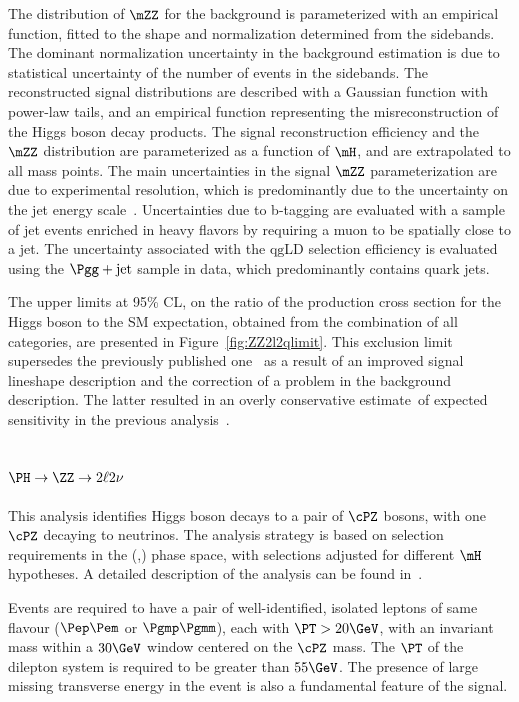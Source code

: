The distribution of $\mZZ$ for the background is parameterized with an empirical function, fitted to the shape and normalization determined from the sidebands. The dominant normalization uncertainty in the background estimation
is due to statistical uncertainty of the number of events in the sidebands. The reconstructed signal distributions are 
described with a Gaussian function with power-law tails, and an empirical function representing the misreconstruction of
the Higgs boson decay products. The signal reconstruction efficiency and the $\mZZ$ distribution are parameterized as a 
function of $\mH$, and are extrapolated to all mass points. The main uncertainties in the signal $\mZZ$ parameterization
are due to experimental resolution, which is predominantly due to the uncertainty on the jet energy scale~\cite{Chatrchyan:2011ds}. Uncertainties due to b-tagging are evaluated with a sample of jet events enriched in
heavy flavors by requiring a muon to be spatially close to a jet. The uncertainty associated with the $\mathrm{qg}$LD 
selection efficiency is evaluated using the $\Pgg+\text{jet}$ sample in data, which predominantly contains quark jets.

The upper limits at 95\% CL, on the ratio of the production cross section for the Higgs boson to the SM expectation,
obtained from the combination of all categories, are presented in Figure~\ref{fig:ZZ2l2qlimit}.
This exclusion limit supersedes the previously published one~\cite{2l2qpaper} as a result of
an improved signal lineshape description and the correction of
a problem
in the background
description. The latter resulted in an overly conservative estimate of expected sensitivity in
the previous analysis~\cite{2l2qpaper}.

\subsection{$\PH \to \ZZ \to 2\ell 2\nu$}

This analysis identifies Higgs boson decays to a pair of $\cPZ$ bosons, with one $\cPZ$ decaying to neutrinos. The
analysis strategy is based on selection requirements in the (\MET,\MT) phase space, with selections adjusted for
different $\mH$ hypotheses. A detailed description of the analysis can be found in~\cite{Chatrchyan:2012ft}.

Events are required to have a pair of well-identified, isolated leptons of same flavour ($\Pep\Pem$ or $\Pgmp\Pgmm$),
each with $\PT > 20\GeV$, with an invariant mass within a $30\GeV$ window centered on the $\cPZ$ mass. The $\PT$
of the dilepton system is required to be greater than $55\GeV$. The presence of large missing transverse energy in the
event is also a fundamental feature of the signal.

